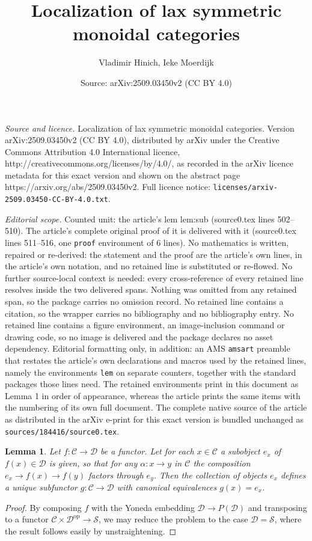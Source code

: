 \documentclass[10pt,a4paper]{amsart}
\title{Localization of lax symmetric monoidal categories}
\author{Vladimir Hinich, Ieke Moerdijk}
\date{Source: arXiv:2509.03450v2 (CC BY 4.0)}
\newtheorem{lem}{Lemma}
\newcommand{\cC}{\mathcal{C}}
\newcommand{\cD}{\mathcal{D}}
\newcommand{\cS}{\mathcal{S}}
\newcommand{\op}{\mathrm{op}}
\begin{document}
\maketitle

\noindent\emph{Source and licence.} Localization of lax symmetric monoidal categories. Version arXiv:2509.03450v2 (CC BY 4.0), distributed by arXiv under the Creative Commons Attribution 4.0 International licence, http://creativecommons.org/licenses/by/4.0/, as recorded in the arXiv licence metadata for this exact version and shown on the abstract page https://arxiv.org/abs/2509.03450v2. Full licence notice: \texttt{licenses/arxiv-2509.03450-CC-BY-4.0.txt}.\par\smallskip

\noindent\textit{Editorial scope.} Counted unit: the article's lem lem:sub (source0.tex lines 502--510). The article's complete original proof of it is delivered with it (source0.tex lines 511--516, one \texttt{proof} environment of 6 lines). No mathematics is written, repaired or re-derived: the statement and the proof are the article's own lines, in the article's own notation, and no retained line is substituted or re-flowed.  No further source-local context is needed: every cross-reference of every retained line resolves inside the two delivered spans.  Nothing was omitted from any retained span, so the package carries no omission record.  No retained line contains a citation, so the wrapper carries no bibliography and no bibliography entry.  No retained line contains a figure environment, an image-inclusion command or drawing code, so no image is delivered and the package declares no asset dependency.  Editorial formatting only, in addition: an AMS \texttt{amsart} preamble that restates the article's own declarations and macros used by the retained lines, namely the environments \texttt{lem} on separate counters, together with the standard packages those lines need.  The retained environments print in this document as Lemma 1 in order of appearance, whereas the article prints the same items with the numbering of its own full document.  The complete native source of the article as distributed in the arXiv e-print for this exact version is bundled unchanged as \texttt{sources/184416/source0.tex}.
\begin{lem} 
\label{lem:sub}
Let $f:\cC\to\cD$ be a functor. Let for each $x\in\cC$
a subobject $e_x$ of $f(x)\in\cD$ is given, so that for any 
$\alpha:x\to y$ in $\cC$ the composition $e_x\to f(x)\to f(y)$
factors through $e_y$. Then the collection of objects $e_x$ defines
a unique subfunctor $g:\cC\to \cD$ with canonical equivalences
$g(x)=e_x$.
\end{lem}

\begin{proof}
By composing $f$ with the Yoneda embedding $\cD\to P(\cD)$
and transposing to a functor $\cC\times\cD^\op\to\cS$, we may reduce the
problem to the case $\cD=\cS$, where the result follows easily by 
unstraightening.
\end{proof}
\end{document}
